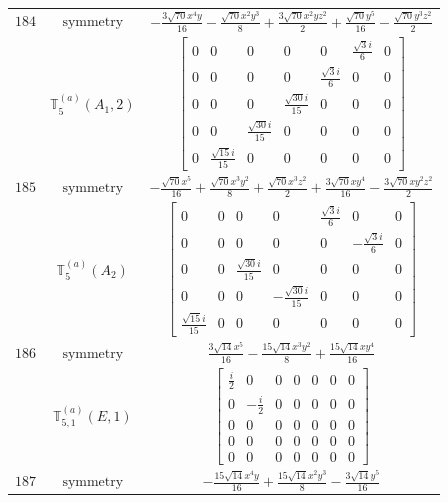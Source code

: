 \documentclass[fleqn,8pt,landscape]{jsarticle}
\begin{document}
\begin{longtable}{ccc}
$ 184 $ & $ \text{symmetry} $ & $ - \frac{3 \sqrt{70} x^{4} y}{16} - \frac{\sqrt{70} x^{2} y^{3}}{8} + \frac{3 \sqrt{70} x^{2} y z^{2}}{2} + \frac{\sqrt{70} y^{5}}{16} - \frac{\sqrt{70} y^{3} z^{2}}{2} $ \\
$  $ & $ \mathbb{T}_{5}^{(a)}(A_{1},2) $ & $ \begin{bmatrix} 0 & 0 & 0 & 0 & 0 & \frac{\sqrt{3} i}{6} & 0 \\ 0 & 0 & 0 & 0 & \frac{\sqrt{3} i}{6} & 0 & 0 \\ 0 & 0 & 0 & \frac{\sqrt{30} i}{15} & 0 & 0 & 0 \\ 0 & 0 & \frac{\sqrt{30} i}{15} & 0 & 0 & 0 & 0 \\ 0 & \frac{\sqrt{15} i}{15} & 0 & 0 & 0 & 0 & 0 \end{bmatrix} $ \\ \hline
$ 185 $ & $ \text{symmetry} $ & $ - \frac{\sqrt{70} x^{5}}{16} + \frac{\sqrt{70} x^{3} y^{2}}{8} + \frac{\sqrt{70} x^{3} z^{2}}{2} + \frac{3 \sqrt{70} x y^{4}}{16} - \frac{3 \sqrt{70} x y^{2} z^{2}}{2} $ \\
$  $ & $ \mathbb{T}_{5}^{(a)}(A_{2}) $ & $ \begin{bmatrix} 0 & 0 & 0 & 0 & \frac{\sqrt{3} i}{6} & 0 & 0 \\ 0 & 0 & 0 & 0 & 0 & - \frac{\sqrt{3} i}{6} & 0 \\ 0 & 0 & \frac{\sqrt{30} i}{15} & 0 & 0 & 0 & 0 \\ 0 & 0 & 0 & - \frac{\sqrt{30} i}{15} & 0 & 0 & 0 \\ \frac{\sqrt{15} i}{15} & 0 & 0 & 0 & 0 & 0 & 0 \end{bmatrix} $ \\ \hline
$ 186 $ & $ \text{symmetry} $ & $ \frac{3 \sqrt{14} x^{5}}{16} - \frac{15 \sqrt{14} x^{3} y^{2}}{8} + \frac{15 \sqrt{14} x y^{4}}{16} $ \\
$  $ & $ \mathbb{T}_{5,1}^{(a)}(E,1) $ & $ \begin{bmatrix} \frac{i}{2} & 0 & 0 & 0 & 0 & 0 & 0 \\ 0 & - \frac{i}{2} & 0 & 0 & 0 & 0 & 0 \\ 0 & 0 & 0 & 0 & 0 & 0 & 0 \\ 0 & 0 & 0 & 0 & 0 & 0 & 0 \\ 0 & 0 & 0 & 0 & 0 & 0 & 0 \end{bmatrix} $ \\ \hline
$ 187 $ & $ \text{symmetry} $ & $ - \frac{15 \sqrt{14} x^{4} y}{16} + \frac{15 \sqrt{14} x^{2} y^{3}}{8} - \frac{3 \sqrt{14} y^{5}}{16} $ \\

\end{longtable}
\end{document}
